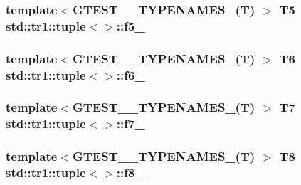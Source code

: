 \subsubsection[{\texorpdfstring{f5\+\_\+}{f5_}}]{\setlength{\rightskip}{0pt plus 5cm}template$<$G\+T\+E\+S\+T\+\_\+\_\+\+T\+Y\+P\+E\+N\+A\+M\+E\+S\+\_\+(\+T) $>$ T5 {\bf std\+::tr1\+::tuple}$<$$>$\+::f5\+\_\+}\hypertarget{classstd_1_1tr1_1_1tuple_a32d8cd6f180c0a77d83733fc65423657}{}\label{classstd_1_1tr1_1_1tuple_a32d8cd6f180c0a77d83733fc65423657}
\subsubsection[{\texorpdfstring{f6\+\_\+}{f6_}}]{\setlength{\rightskip}{0pt plus 5cm}template$<$G\+T\+E\+S\+T\+\_\+\_\+\+T\+Y\+P\+E\+N\+A\+M\+E\+S\+\_\+(\+T) $>$ T6 {\bf std\+::tr1\+::tuple}$<$$>$\+::f6\+\_\+}\hypertarget{classstd_1_1tr1_1_1tuple_a597beab3af3f95c84408491ab14632b0}{}\label{classstd_1_1tr1_1_1tuple_a597beab3af3f95c84408491ab14632b0}
\subsubsection[{\texorpdfstring{f7\+\_\+}{f7_}}]{\setlength{\rightskip}{0pt plus 5cm}template$<$G\+T\+E\+S\+T\+\_\+\_\+\+T\+Y\+P\+E\+N\+A\+M\+E\+S\+\_\+(\+T) $>$ T7 {\bf std\+::tr1\+::tuple}$<$$>$\+::f7\+\_\+}\hypertarget{classstd_1_1tr1_1_1tuple_a7c28780e616d382833e844f62672c6bc}{}\label{classstd_1_1tr1_1_1tuple_a7c28780e616d382833e844f62672c6bc}
\subsubsection[{\texorpdfstring{f8\+\_\+}{f8_}}]{\setlength{\rightskip}{0pt plus 5cm}template$<$G\+T\+E\+S\+T\+\_\+\_\+\+T\+Y\+P\+E\+N\+A\+M\+E\+S\+\_\+(\+T) $>$ T8 {\bf std\+::tr1\+::tuple}$<$$>$\+::f8\+\_\+}\hypertarget{classstd_1_1tr1_1_1tuple_ae859012c83943e54e035a4a32089ccb6}{}\label{classstd_1_1tr1_1_1tuple_ae859012c83943e54e035a4a32089ccb6}
